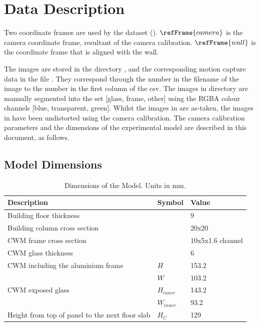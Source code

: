 \section*{Data Description}
Two coordinate frames are used by the dataset (). $\refFrame{camera}$ is the camera coordinate frame, resultant of the camera calibration. $\refFrame{wall}$ is the coordinate frame that is aligned with the wall.

The images are stored in the directory , and the corresponding motion capture data in the file . They correspond through the number in the filename of the image to the number in the first column of the csv. The images in directory  are manually segmented into the set [glass, frame, other] using the RGBA colour channels [blue, transparent, green]. Whilst the images in  are as-taken, the images in  have been undistorted using the camera calibration. The camera calibration parameters and the dimensions of the experimental model are described in this document, as follows.


\subsection*{Model Dimensions}
\begin{table}[!h]
    \centering
    \begin{tabular}{lll}
        \hline
        Description & Symbol & Value\\
        \hline
        Building floor thickness & & 9\\
        Building column cross section & & 20x20\\
        CWM frame cross section & & 10x5x1.6 channel\\
        CWM glass thickness & & 6\\
        CWM including the aluminium frame
        & $H$ & 153.2\\
        & $W$ & 103.2\\
        CWM exposed glass
        & $H_{inner}$ & 143.2\\
        & $W_{inner}$ & 93.2\\
        Height from top of panel to the next floor slab
        & $H_C$ & 129\\
        \hline
        \end{tabular}
    \caption{Dimensions of the Model. Units in mm.}
    \label{tb:ModelDimensions}
\end{table}


